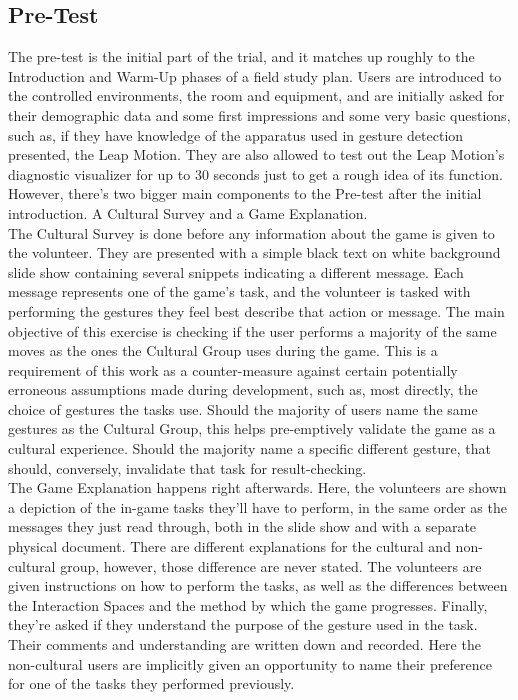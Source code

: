     \subsection{Pre-Test} \label{sec:develop_trials_pre}
    The pre-test is the initial part of the trial, and it matches up roughly to the Introduction and Warm-Up phases of a field study plan. Users are introduced to the controlled environments, the room and equipment, and are initially asked for their demographic data and some first impressions and some very basic questions, such as, if they have knowledge of the apparatus used in gesture detection presented, the Leap Motion. They are also allowed to test out the Leap Motion’s diagnostic visualizer for up to 30 seconds just to get a rough idea of its function.\\
    However, there’s two bigger main components to the Pre-test after the initial introduction. A Cultural Survey and a Game Explanation.\\
    The Cultural Survey is done before any information about the game is given to the volunteer. They are presented with a simple black text on white background slide show containing several snippets indicating a different message. Each message represents one of the game’s task, and the volunteer is tasked with performing the gestures they feel best describe that action or message. The main objective of this exercise is checking if the user performs a majority of the same moves as the ones the Cultural Group uses during the game. This is a requirement of this work as a counter-measure against certain potentially erroneous assumptions made during development, such as, most directly, the choice of gestures the tasks use. Should the majority of users name the same gestures as the Cultural Group, this helps pre-emptively validate the game as a cultural experience. Should the majority name a specific different gesture, that should, conversely, invalidate that task for result-checking.\\
    The Game Explanation happens right afterwards. Here, the volunteers are shown a depiction of the in-game tasks they’ll have to perform, in the same order as the messages they just read through, both in the slide show and with a separate physical document. There are different explanations for the cultural and non-cultural group, however, those difference are never stated. The volunteers are given instructions on how to perform the tasks, as well as the differences between the Interaction Spaces and the method by which the game progresses. Finally, they’re asked if they understand the purpose of the gesture used in the task. Their comments and understanding are written down and recorded. Here the non-cultural users are implicitly given an opportunity to name their preference for one of the tasks they performed previously.\\
  

